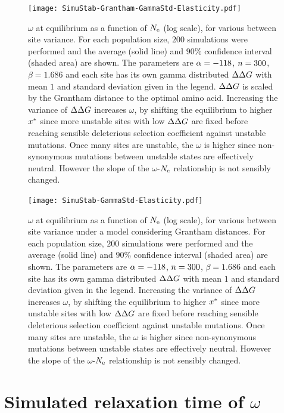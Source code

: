 \begin{figure}[H]
	\centering
	\texttt{[image: SimuStab-Grantham-GammaStd-Elasticity.pdf]}
	\caption[Effect of site variance on the susceptibility]{
	$\omega$ at equilibrium as a function of $N_{\mathrm{e}}$ (log scale), for various between site variance.
	For each population size, $200$ simulations were performed and the average (solid line) and $90\%$ confidence interval (shaded area) are shown.
	The parameters are $\alpha=-118$, $n=300$, $\beta=1.686$ and each site has its own gamma distributed $\Delta \Delta G$ with mean $1$ and standard deviation given in the legend. $\Delta \Delta G$ is scaled by the Grantham distance to the optimal amino acid.
	Increasing the variance of $\Delta \Delta G$ increases $\omega$, by shifting the equilibrium to higher $x^{*}$ since more unstable sites with low $\Delta \Delta G$ are fixed before reaching sensible deleterious selection coefficient against unstable mutations. Once many sites are unstable, the $\omega$ is higher since non-synonymous mutations between unstable states are effectively neutral. However the slope of the $\omega$-$N_{\mathrm{e}}$ relationship is not sensibly changed.
	}
\end{figure}

\begin{figure}[H]
	\centering
	\texttt{[image: SimuStab-GammaStd-Elasticity.pdf]}
	\caption[Effect of site variance on the susceptibility without Grantham distance]{
	$\omega$ at equilibrium as a function of $N_{\mathrm{e}}$ (log scale), for various between site variance under a model considering Grantham distances.
	For each population size, $200$ simulations were performed and the average (solid line) and $90\%$ confidence interval (shaded area) are shown.
	The parameters are $\alpha=-118$, $n=300$, $\beta=1.686$ and each site has its own gamma distributed $\Delta \Delta G$ with mean $1$ and standard deviation given in the legend.
	Increasing the variance of $\Delta \Delta G$ increases $\omega$, by shifting the equilibrium to higher $x^{*}$ since more unstable sites with low $\Delta \Delta G$ are fixed before reaching sensible deleterious selection coefficient against unstable mutations. Once many sites are unstable, the $\omega$ is higher since non-synonymous mutations between unstable states are effectively neutral. However the slope of the $\omega$-$N_{\mathrm{e}}$ relationship is not sensibly changed.
	}
\end{figure}

\section{Simulated relaxation time of \texorpdfstring{$\omega$}{ω}}
\label{sec:simulated-relaxation-time-of-omega}

